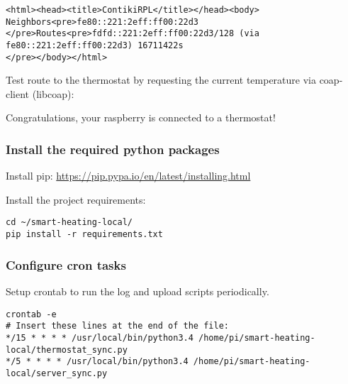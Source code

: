 \noindent
\begin{minipage}{\linewidth}
\begin{lstlisting}[numbers=none]
<html><head><title>ContikiRPL</title></head><body>
Neighbors<pre>fe80::221:2eff:ff00:22d3
</pre>Routes<pre>fdfd::221:2eff:ff00:22d3/128 (via fe80::221:2eff:ff00:22d3) 16711422s
</pre></body></html>
\end{lstlisting}
\end{minipage}

Test route to the thermostat by requesting the current temperature via
coap-client (libcoap):

Congratulations, your raspberry is connected to a thermostat!

\subsubsection{Install the required python packages}\label{install-the-required-python-packages}

Install pip: \url{https://pip.pypa.io/en/latest/installing.html}

\noindent
Install the project requirements:

\noindent
\begin{minipage}{\linewidth}
	\begin{lstlisting}[numbers=none]
cd ~/smart-heating-local/
pip install -r requirements.txt
	\end{lstlisting}
\end{minipage}

\subsubsection{Configure cron tasks}

Setup crontab to run the log and upload scripts periodically.

\noindent
\begin{minipage}{\linewidth}
\begin{lstlisting}
crontab -e
# Insert these lines at the end of the file:
*/15 * * * * /usr/local/bin/python3.4 /home/pi/smart-heating-local/thermostat_sync.py
*/5 * * * * /usr/local/bin/python3.4 /home/pi/smart-heating-local/server_sync.py
\end{lstlisting}
\end{minipage}

